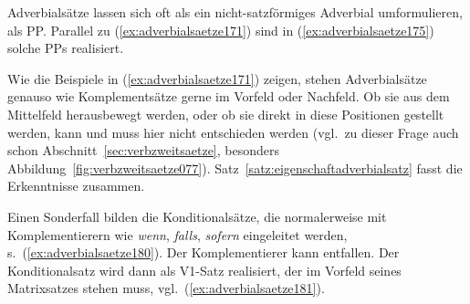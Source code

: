 \begin{exe}
  \ex\label{ex:adverbialsaetze171}
  \begin{xlist}
  \end{xlist}
\end{exe}

Adverbialsätze lassen sich oft als ein nicht-satzförmiges Adverbial umformulieren, \zB als PP.
Parallel zu (\ref{ex:adverbialsaetze171}) sind in (\ref{ex:adverbialsaetze175}) solche PPs realisiert.

\begin{exe}
  \ex\label{ex:adverbialsaetze175}
  \begin{xlist}
  \end{xlist}
\end{exe}


Wie die Beispiele in (\ref{ex:adverbialsaetze171}) zeigen, stehen Adverbialsätze genauso wie Komplementsätze gerne im Vorfeld oder Nachfeld.
Ob sie aus dem Mittelfeld herausbewegt werden, oder ob sie direkt in diese Positionen gestellt werden, kann und muss hier nicht entschieden werden (vgl.\ zu dieser Frage auch schon Abschnitt~\ref{sec:verbzweitsaetze}, besonders Abbildung~\ref{fig:verbzweitsaetze077}).
Satz~\ref{satz:eigenschaftadverbialsatz} fasst die Erkenntnisse zusammen.



Einen Sonderfall bilden die Konditionalsätze, die normalerweise mit Komplementierern wie \textit{wenn}, \textit{falls}, \textit{sofern} eingeleitet werden, s.\ (\ref{ex:adverbialsaetze180}).
Der Komplementierer kann entfallen.
Der Konditionalsatz wird dann als V1-Satz realisiert, der im Vorfeld seines Matrixsatzes stehen muss, vgl.\ (\ref{ex:adverbialsaetze181}).

